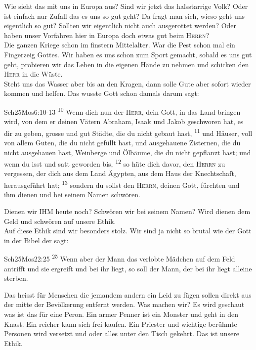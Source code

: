 Wie sieht das mit uns in Europa aus? Sind wir jetzt das halsstarrige Volk? Oder ist einfach nur Zufall das es uns so gut geht? Da fragt man sich, wieso geht uns eigentlich so gut? Sollten wir eigentlich nicht auch ausgerottet werden? Oder haben unser Vorfahren hier in Europa doch etwas gut beim \textsc{Herrn}?\\
Die ganzen Kriege schon im finstern Mittelalter. War die Pest schon mal ein Fingerzeig Gottes. Wir haben es uns schon zum Sport gemacht, sobald es uns gut geht, probieren wir das Leben in die eigenen Hände zu nehmen und schicken den \textsc{Herr} in die Wüste.\\
Steht uns das Wasser aber bis an den Kragen, dann solle Gute aber sofort wieder kommen und helfen. Das wusste Gott schon damals darum sagt:
\begin{bibeltext}{Sch2}{5Mos}{6:10-13}
    \textsuperscript{10} Wenn dich nun der \textsc{Herr}, dein Gott, in das Land bringen wird, von dem er deinen Vätern Abraham, Isaak und Jakob geschworen hat, es dir zu geben, grosse und gut Städte, die du nicht gebaut hast, \textsuperscript{11} und Häuser, voll von allem Guten, die du nicht gefüllt hast, und ausgehauene Zisternen, die du nicht ausgehauen hast, Weinberge und Ölbäume, die du nicht gepflanzt hast; und wenn du isst und satt geworden bis, \textsuperscript{12} so hüte dich davor, den \textsc{Herrn} zu vergessen, der dich aus dem Land Ägypten, aus dem Haus der Knechtschaft, herausgeführt hat; \textsuperscript{13} sondern du sollst den \textsc{Herrn}, deinen Gott, fürchten und ihm dienen und bei seinem Namen schwören.
\end{bibeltext}
Dienen wir IHM heute noch? Schwören wir bei seinem Namen? Wird dienen dem Geld und schwören auf unsere Ethik.\\
Auf diese Ethik sind wir besonders stolz. Wir sind ja nicht so brutal wie der Gott in der Bibel der sagt:
\begin{bibeltext}{Sch2}{5Mos}{22:25}
    \textsuperscript{25} Wenn aber der Mann das verlobte Mädchen auf dem Feld antrifft und sie ergreift und bei ihr liegt, so soll der Mann, der bei ihr liegt alleine sterben.
\end{bibeltext}
Das heisst für Menschen die jemandem andern ein Leid zu fügen sollen direkt aus der mitte der Bevölkerung entfernt werden. Was machen wir? Es wird geschaut was ist das für eine Peron. Ein armer Penner ist ein Monster und geht in den Knast. Ein reicher kann sich frei kaufen. Ein Priester und wichtige berühmte Personen wird versetzt und oder alles unter den Tisch gekehrt. Das ist unsere Ethik.\\ 
